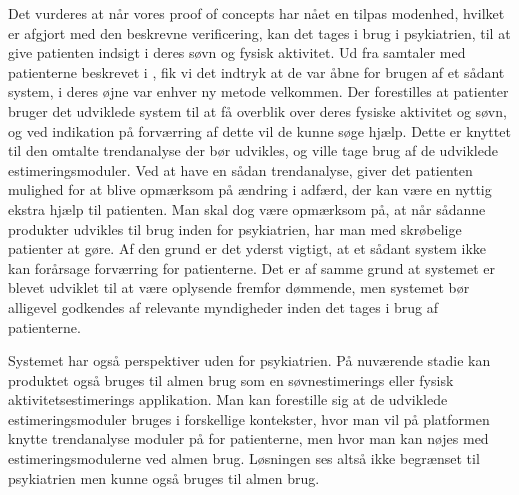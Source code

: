 Det vurderes at når vores proof of concepts har nået en tilpas modenhed, hvilket er afgjort med den beskrevne verificering, kan det tages i brug i psykiatrien, til at give patienten indsigt i deres søvn og fysisk aktivitet. 
Ud fra samtaler med patienterne beskrevet i \citet[1.5 Fokusgruppeinterview]{misc:faellesrapp}, fik vi det indtryk at de var åbne for brugen af et sådant system, i deres øjne var enhver ny metode velkommen.
Der forestilles at patienter bruger det udviklede system til at få overblik over deres fysiske aktivitet og søvn, og ved indikation på forværring af dette vil de kunne søge hjælp. 
Dette er knyttet til den omtalte trendanalyse der bør udvikles, og ville tage brug af de udviklede estimeringsmoduler.
Ved at have en sådan trendanalyse, giver det patienten mulighed for at blive opmærksom på ændring i adfærd, der kan være en nyttig ekstra hjælp til patienten.
Man skal dog være opmærksom på, at når sådanne produkter udvikles til brug inden for psykiatrien, har man med skrøbelige patienter at gøre.
Af den grund er det yderst vigtigt, at et sådant system ikke kan forårsage forværring for patienterne.
Det er af samme grund at systemet er blevet udviklet til at være oplysende fremfor dømmende, men systemet bør alligevel godkendes af relevante myndigheder inden det tages i brug af patienterne.

Systemet har også perspektiver uden for psykiatrien.
På nuværende stadie kan produktet også bruges til almen brug som en søvnestimerings eller fysisk aktivitetsestimerings applikation.
Man kan forestille sig at de udviklede estimeringsmoduler bruges i forskellige kontekster, hvor man vil på platformen knytte trendanalyse moduler på for patienterne, men hvor man kan nøjes med estimeringsmodulerne ved almen brug.
Løsningen ses altså ikke begrænset til psykiatrien men kunne også bruges til almen brug.

